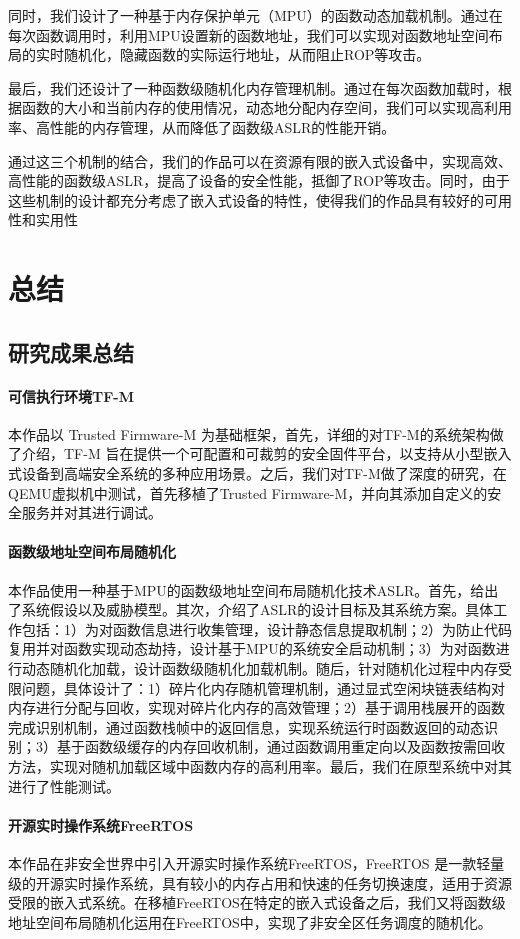 \documentclass[UTF8,12pt,a4paper]{ctexart}
\numberwithin{figure}{section}
\begin{document}
\par 同时，我们设计了一种基于内存保护单元（MPU）的函数动态加载机制。通过在每次函数调用时，利用MPU设置新的函数地址，我们可以实现对函数地址空间布局的实时随机化，隐藏函数的实际运行地址，从而阻止ROP等攻击。

\par 最后，我们还设计了一种函数级随机化内存管理机制。通过在每次函数加载时，根据函数的大小和当前内存的使用情况，动态地分配内存空间，我们可以实现高利用率、高性能的内存管理，从而降低了函数级ASLR的性能开销。

\par 通过这三个机制的结合，我们的作品可以在资源有限的嵌入式设备中，实现高效、高性能的函数级ASLR，提高了设备的安全性能，抵御了ROP等攻击。同时，由于这些机制的设计都充分考虑了嵌入式设备的特性，使得我们的作品具有较好的可用性和实用性


\section{总结}
\subsection{研究成果总结}
\paragraph{可信执行环境TF-M}
\par 本作品以 Trusted Firmware-M 为基础框架，首先，详细的对TF-M的系统架构做了介绍，TF-M 旨在提供一个可配置和可裁剪的安全固件平台，以支持从小型嵌入式设备到高端安全系统的多种应用场景。之后，我们对TF-M做了深度的研究，在QEMU虚拟机中测试，首先移植了Trusted Firmware-M，并向其添加自定义的安全服务并对其进行调试。
\paragraph{函数级地址空间布局随机化}
\par 本作品使用一种基于MPU的函数级地址空间布局随机化技术ASLR。首先，给出了系统假设以及威胁模型。其次，介绍了ASLR的设计目标及其系统方案。具体工作包括：1）为对函数信息进行收集管理，设计静态信息提取机制；2）为防止代码复用并对函数实现动态劫持，设计基于MPU的系统安全启动机制；3）为对函数进行动态随机化加载，设计函数级随机化加载机制。随后，针对随机化过程中内存受限问题，具体设计了：1）碎片化内存随机管理机制，通过显式空闲块链表结构对内存进行分配与回收，实现对碎片化内存的高效管理；2）基于调用栈展开的函数完成识别机制，通过函数栈帧中的返回信息，实现系统运行时函数返回的动态识别；3）基于函数级缓存的内存回收机制，通过函数调用重定向以及函数按需回收方法，实现对随机加载区域中函数内存的高利用率。最后，我们在原型系统中对其进行了性能测试。
\paragraph{开源实时操作系统FreeRTOS}
\par 本作品在非安全世界中引入开源实时操作系统FreeRTOS，FreeRTOS 是一款轻量级的开源实时操作系统，具有较小的内存占用和快速的任务切换速度，适用于资源受限的嵌入式系统。在移植FreeRTOS在特定的嵌入式设备之后，我们又将函数级地址空间布局随机化运用在FreeRTOS中，实现了非安全区任务调度的随机化。
\clearpage
\pagestyle{refStyle}


\end{document}
